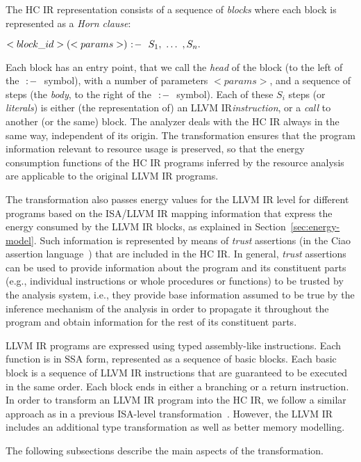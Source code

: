 \documentclass{llncs}
\newcommand{\level}{level\xspace}
\newcommand{\hcir}{HC IR\xspace}
\newcommand{\llvmir}{LLVM IR\xspace}
\newcommand{\ciao}{Ciao\xspace}
\def\imp{\hbox{${\tt \ :\!-\ }$}}
\begin{document}
The \hcir representation consists of a sequence of \emph{blocks} where
each block is represented as a \emph{Horn clause}:

\centerline{\mbox{$<block\_id>( <params> ) \imp \ S_1, \ \ldots \ ,S_n.$}}

\noindent
Each block has an entry point, that we call the \emph{head} of the
block (to the left of the $\imp$ symbol),
with a number of parameters $<params>$, and a sequence of steps (the
\emph{body}, to the right of the $\imp$ symbol). Each of these $S_i$
steps (or \emph{literals}) is either (the representation of) an
\llvmir \emph{instruction}, or a \emph{call} to another (or the same)
block.
The analyzer deals with the \hcir always in the same way, independent
of its origin.
The transformation ensures that the program information relevant to
resource usage is preserved, so that the energy consumption functions
of the \hcir programs inferred by the resource analysis are applicable
to the original \llvmir programs.

The transformation also 
passes energy values for the
\llvmir \level for different programs based on the ISA/\llvmir mapping
information that express the energy consumed by the \llvmir blocks, as
explained in Section~\ref{sec:energy-model}. Such information is
represented by means of \emph{trust} assertions (in the \ciao
assertion language~\cite{hermenegildo11:ciao-design-tplp-short}) that
are included in the \hcir.
In general, \emph{trust} assertions can be used to provide information
about the program and its constituent parts (e.g., individual
instructions or whole procedures or functions) to be trusted by the
analysis system, i.e., they provide base information assumed to be
true by the inference mechanism of the analysis in order to propagate
it throughout the program and obtain information for the rest of its
constituent parts.

\llvmir programs are expressed using typed assembly-like
instructions. Each function is in SSA form, represented as a sequence
of basic blocks. Each basic block is a sequence of \llvmir
instructions that are guaranteed to be executed in the same order.
Each block ends in either a branching or a 
return instruction. 
In order to transform an \llvmir program into the \hcir, 
we follow a similar approach as in a 
previous
ISA-\level transformation~\cite{isa-energy-lopstr13-final}. 
However, the \llvmir includes an additional type transformation as
well as better memory modelling. 

The following subsections describe the main aspects of the transformation. 
\end{document}
